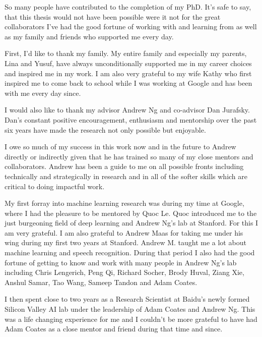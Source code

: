 

So many people have contributed to the completion of my PhD. It's safe to say,
that this thesis would not have been possible were it not for the great
collaborators I've had the good fortune of working with and learning from as
well as my family and friends who supported me every day.

First, I'd like to thank my family. My entire family and especially my parents,
Lina and Yusuf, have always unconditionally supported me in my career choices
and inspired me in my work. I am also very grateful to my wife Kathy who first
inspired me to come back to school while I was working at Google and has been
with me every day since.

I would also like to thank my advisor Andrew Ng and co-advisor Dan Jurafsky.
Dan's constant positive encouragement, enthusiasm and mentorship over the past
six years have made the research not only possible but enjoyable.

I owe so much of my success in this work now and in the future to Andrew
directly or indirectly given that he has trained so many of my close mentors
and collaborators. Andrew has been a guide to me on all possible fronts
including technically and strategically in research and in all of the softer
skills which are critical to doing impactful work.

My first forray into machine learning research was during my time at Google,
where I had the pleasure to be mentored by Quoc Le. Quoc introduced me to the
just burgeoning field of deep learning and Andrew Ng's lab at Stanford. For
this I am very grateful. I am also grateful to Andrew Maas for taking me under
his wing during my first two years at Stanford. Andrew M. taught me a lot about
machine learning and speech recognition. During that period I also had the good
fortune of getting to know and work with many people in Andrew Ng's lab
including Chris Lengerich, Peng Qi, Richard Socher, Brody Huval, Ziang Xie,
Anshul Samar, Tao Wang, Sameep Tandon and Adam Coates.

I then spent close to two years as a Research Scientist at Baidu's newly formed
Silicon Valley AI lab under the leadership of Adam Coates and Andrew Ng. This
was a life changing experience for me and I couldn't be more grateful to have
had Adam Coates as a close mentor and friend during that time and since.

